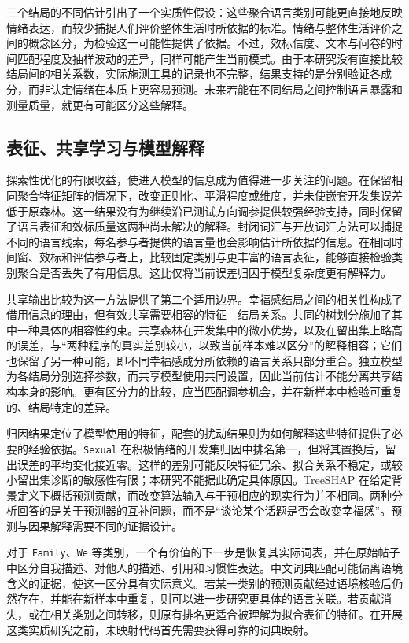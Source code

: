 三个结局的不同估计引出了一个实质性假设：这些聚合语言类别可能更直接地反映情绪表达，而较少捕捉人们评价整体生活时所依据的标准。情绪与整体生活评价之间的概念区分，为检验这一可能性提供了依据\citep{diener1984,diener1985}。不过，效标信度、文本与问卷的时间匹配程度及抽样波动的差异，同样可能产生当前模式。由于本研究没有直接比较结局间的相关系数，实际施测工具的记录也不完整，结果支持的是分别验证各成分，而非认定情绪在本质上更容易预测。未来若能在不同结局之间控制语言暴露和测量质量，就更有可能区分这些解释。

\subsection{表征、共享学习与模型解释}
探索性优化的有限收益，使进入模型的信息成为值得进一步关注的问题。在保留相同聚合特征矩阵的情况下，改变正则化、平滑程度或维度，并未使嵌套开发集误差低于原森林。这一结果没有为继续沿已测试方向调参提供较强经验支持，同时保留了语言表征和效标质量这两种尚未解决的解释。封闭词汇与开放词汇方法可以捕捉不同的语言线索\citep{eichstaedt2021}，每名参与者提供的语言量也会影响估计所依据的信息\citep{kern2016}。在相同时间窗、效标和评估参与者上，比较固定类别与更丰富的语言表征，能够直接检验类别聚合是否丢失了有用信息。这比仅将当前误差归因于模型复杂度更有解释力。

共享输出比较为这一方法提供了第二个适用边界。幸福感结局之间的相关性构成了借用信息的理由，但有效共享需要相容的特征—结局关系。共同的树划分施加了其中一种具体的相容性约束\citep{caruana1997,kocev2007}。共享森林在开发集中的微小优势，以及在留出集上略高的误差，与“两种程序的真实差别较小，以致当前样本难以区分”的解释相容；它们也保留了另一种可能，即不同幸福感成分所依赖的语言关系只部分重合。独立模型为各结局分别选择参数，而共享模型使用共同设置，因此当前估计不能分离共享结构本身的影响。更有区分力的比较，应当匹配调参机会，并在新样本中检验可重复的、结局特定的差异。

归因结果定位了模型使用的特征，配套的扰动结果则为如何解释这些特征提供了必要的经验依据。\texttt{Sexual} 在积极情绪的开发集归因中排名第一，但将其置换后，留出误差的平均变化接近零。这样的差别可能反映特征冗余、拟合关系不稳定，或较小留出集诊断的敏感性有限；本研究不能据此确定具体原因。TreeSHAP 在给定背景定义下概括预测贡献\citep{lundberg2020}，而改变算法输入与干预相应的现实行为并不相同\citep{janzing2020}。两种分析回答的是关于预测器的互补问题，而不是“谈论某个话题是否会改变幸福感”。预测与因果解释需要不同的证据设计\citep{shmueli2010}。

对于 \texttt{Family}、\texttt{We} 等类别，一个有价值的下一步是恢复其实际词表，并在原始帖子中区分自我描述、对他人的描述、引用和习惯性表达。中文词典匹配可能偏离语境含义的证据，使这一区分具有实际意义\citep{zhao2016}。若某一类别的预测贡献经过语境核验后仍然存在，并能在新样本中重复，则可以进一步研究更具体的语言关联。若贡献消失，或在相关类别之间转移，则原有排名更适合被理解为拟合表征的特征。在开展这类实质研究之前，未映射代码首先需要获得可靠的词典映射。

